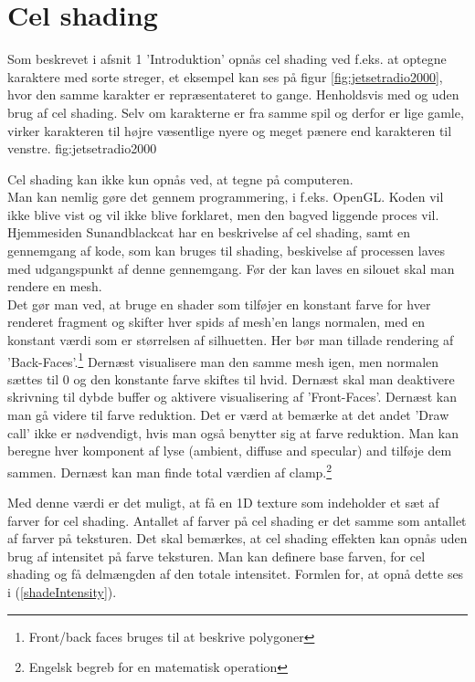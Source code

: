 \newpage
\section{Cel shading}
Som beskrevet i afsnit 1 'Introduktion' opnås cel shading ved f.eks. at optegne karaktere med sorte streger, et eksempel kan ses på figur \ref{fig:jetsetradio2000}, hvor den samme karakter er repræsentateret to gange. Henholdsvis med og uden brug af cel shading. Selv om karakterne er fra samme spil og derfor er lige gamle, virker karakteren til højre væsentlige nyere og meget pænere end karakteren til venstre. 
 {} {fig:jetsetradio2000}

Cel shading kan ikke kun opnås ved, at tegne på computeren.\\ Man kan nemlig gøre det gennem programmering, i f.eks. OpenGL. 
Koden vil ikke blive vist og vil ikke blive forklaret, men den bagved liggende proces vil. Hjemmesiden Sunandblackcat \cite{sunandblackcat2016} har en beskrivelse af cel shading, samt en gennemgang af kode, som kan bruges til shading, beskivelse af processen laves med udgangspunkt af denne gennemgang. Før der kan laves en silouet skal man rendere en mesh. \\
Det gør man ved, at bruge en shader som tilføjer en konstant farve for
hver renderet fragment og skifter hver spids af mesh’en langs normalen, med en konstant værdi
som er størrelsen af silhuetten. Her bør man tillade rendering af ’Back-Faces’.\footnote[2]
{Front/back faces bruges til at beskrive polygoner}
Dernæst visualisere man den samme mesh igen, men normalen sættes til 0 og den konstante farve
skiftes til hvid.
Dernæst skal man deaktivere skrivning til dybde buffer og aktivere
visualisering af ’Front-Faces’. Dernæst kan man gå videre til farve reduktion. Det er værd at
bemærke at det andet ’Draw call’ ikke er nødvendigt, hvis man også benytter sig at farve
reduktion. 
Man kan beregne hver komponent af lyse (ambient, diffuse and specular) and tilføje dem sammen.
Dernæst kan man finde total værdien af clamp.\footnote[3]{Engelsk begreb for en matematisk
operation}

Med denne værdi er det muligt, at få en 1D texture som indeholder et sæt af farver for cel
shading. Antallet af farver på cel shading er det samme som antallet af farver på teksturen.
Det skal bemærkes, at cel shading effekten kan opnås uden brug af intensitet på farve
teksturen. 
Man kan definere base farven, for cel shading og få delmængden af den totale intensitet. Formlen
for, at opnå dette ses i (\ref{shadeIntensity}).

